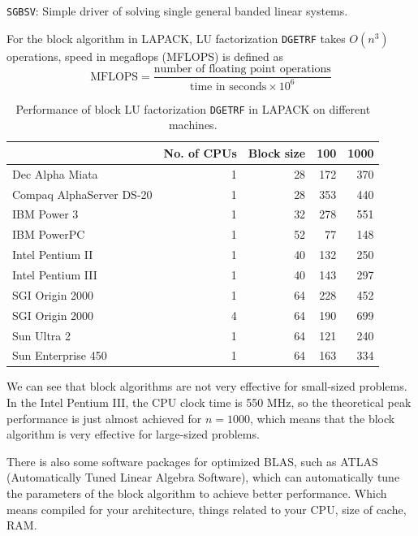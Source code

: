 \begin{eg}
    \texttt{SGBSV}: Simple driver of solving single general banded linear systems.
\end{eg}

For the block algorithm in LAPACK, LU factorization \texttt{DGETRF} takes $O(n^3)$ operations, speed in megaflops (MFLOPS) is defined as
\[
    \mbox{MFLOPS} = \frac{\mbox{number of floating point operations}}{\mbox{time in seconds} \times 10^6}
\]

\begin{table}[H]
    \centering
    \begin{tabular}{@{}lrrrr}
    &No. of CPUs &Block size	&100 	&1000\\ \hline
    Dec Alpha Miata 	&1 	    &  28 	&172 	&370\\
    Compaq AlphaServer DS-20&1 	    &  28 	&353 	&440\\
    IBM Power 3 	        &1 	    &  32 	&278 	&551\\
    IBM PowerPC 	        &1 	    &  52 	&77 	     &148\\
    Intel Pentium II 	&1 	    &  40 	&132 	&250\\
    Intel Pentium III 	&1 	    &  40 	&143 	&297\\
    SGI Origin 2000 	&1 	    &  64 	&228 	&452\\
    SGI Origin 2000 	&4 	    &  64 	&190 	&699\\
    Sun Ultra 2 	        &1 	    &  64 	&121 	&240\\
    Sun Enterprise 450 	&1 	    &  64 	&163 	&334\\
    \end{tabular}
    \caption{Performance of block LU factorization \texttt{DGETRF} in LAPACK on different machines.}
\end{table}

We can see that block algorithms are not very effective for small-sized problems. In the Intel Pentium III, the CPU clock time is 550 MHz, so the theoretical peak performance is just almost achieved for $n = 1000$, which means that the block algorithm is very effective for large-sized problems. 

\begin{note}[ATLAS]
    There is also some software packages for optimized BLAS, such as ATLAS (Automatically Tuned Linear Algebra Software), which can automatically tune the parameters of the block algorithm to achieve better performance. Which means compiled for your architecture, things related to your CPU, size of cache, RAM.
\end{note}